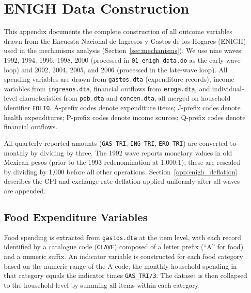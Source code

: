 
\clearpage
\appendix

\section{ENIGH Data Construction}
\label{app:enigh}

This appendix documents the complete construction of all outcome variables
drawn from the Encuesta Nacional de Ingresos y Gastos de los Hogares (ENIGH)
used in the mechanisms analysis (Section~\ref{sec:mechanisms}). We use nine
waves: 1992, 1994, 1996, 1998, 2000 (processed in \texttt{01\_enigh\_data.do}
as the early-wave loop) and 2002, 2004, 2005, and 2006 (processed in the
late-wave loop). All spending variables are drawn from \texttt{gastos.dta}
(expenditure records), income variables from \texttt{ingresos.dta}, financial
outflows from \texttt{eroga.dta}, and individual-level characteristics from
\texttt{pob.dta} and \texttt{concen.dta}, all merged on household identifier
\texttt{FOLIO}. A-prefix codes denote expenditure items; J-prefix codes denote
health expenditures; P-prefix codes denote income sources; Q-prefix codes
denote financial outflows.

All quarterly reported amounts (\texttt{GAS\_TRI}, \texttt{ING\_TRI},
\texttt{ERO\_TRI}) are converted to monthly by dividing by three. The 1992
wave reports monetary values in old Mexican pesos (prior to the 1993
redenomination at 1,000:1); these are rescaled by dividing by 1,000 before
all other operations. Section~\ref{app:enigh_deflation} describes the CPI and
exchange-rate deflation applied uniformly after all waves are appended.

\subsection{Food Expenditure Variables}
\label{app:enigh_food}

Food spending is extracted from \texttt{gastos.dta} at the item level, with
each record identified by a catalogue code (\texttt{CLAVE}) composed of a
letter prefix (``A'' for food) and a numeric suffix. An indicator variable is
constructed for each food category based on the numeric range of the A-code;
the monthly household spending in that category equals the indicator times
\texttt{GAS\_TRI/3}. The dataset is then collapsed to the household level by
summing all items within each category.

